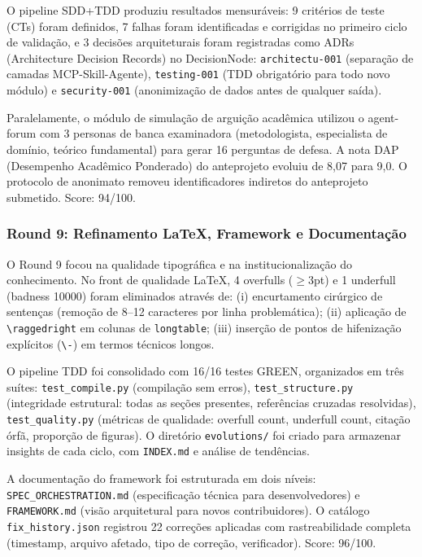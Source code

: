 O pipeline SDD+TDD produziu resultados mensuráveis: 9 critérios de teste
(CTs) foram definidos, 7 falhas foram identificadas e corrigidas no
primeiro ciclo de validação, e 3 decisões arquiteturais foram registradas
como ADRs (Architecture Decision Records) no DecisionNode:
\texttt{architectu-001} (separação de camadas MCP-Skill-Agente),
\texttt{testing-001} (TDD obrigatório para todo novo módulo) e
\texttt{security-001} (anonimização de dados antes de qualquer saída).

Paralelamente, o módulo de simulação de arguição acadêmica utilizou o
agent-forum com 3 personas de banca examinadora (metodologista,
especialista de domínio, teórico fundamental) para gerar 16 perguntas de
defesa. A nota DAP (Desempenho Acadêmico Ponderado) do anteprojeto
evoluiu de 8,07 para 9,0. O protocolo de anonimato removeu
identificadores indiretos do anteprojeto submetido. Score:
94/100.

\subsubsection{Round 9: Refinamento LaTeX, Framework e Documentação}

O Round 9 focou na qualidade tipográfica e na institucionalização do
conhecimento. No front de qualidade LaTeX, 4 overfulls ($\geq 3$pt) e 1
underfull (badness 10000) foram eliminados através de: (i) encurtamento
cirúrgico de sentenças (remoção de 8--12 caracteres por linha
problemática); (ii) aplicação de \texttt{\textbackslash raggedright} em
colunas de \texttt{longtable}; (iii) inserção de pontos de hifenização
explícitos (\texttt{\textbackslash-}) em termos técnicos longos.

O pipeline TDD foi consolidado com 16/16 testes GREEN, organizados em
três suítes: \texttt{test\_compile.py} (compilação sem erros),
\texttt{test\_structure.py} (integridade estrutural: todas as seções
presentes, referências cruzadas resolvidas), \texttt{test\_quality.py}
(métricas de qualidade: overfull count, underfull count, citação órfã,
proporção de figuras). O diretório \texttt{evolutions/} foi criado para
armazenar insights de cada ciclo, com \texttt{INDEX.md} e análise de
tendências.

A documentação do framework foi estruturada em dois níveis:
\texttt{SPEC\_ORCHESTRATION.md} (especificação técnica para
desenvolvedores) e \texttt{FRAMEWORK.md} (visão arquitetural para novos
contribuidores). O catálogo \texttt{fix\_history.json} registrou 22
correções aplicadas com rastreabilidade completa (timestamp, arquivo
afetado, tipo de correção, verificador). Score: 96/100.


